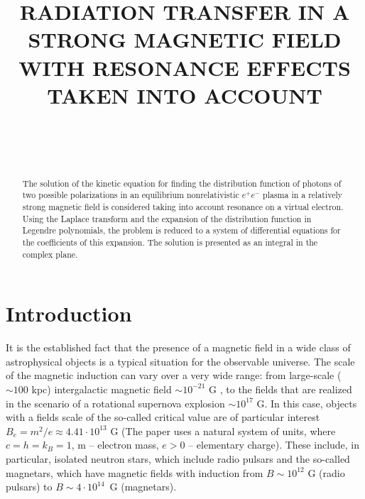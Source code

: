 \documentclass[
aps,%
12pt,%
final,%
notitlepage,%
oneside,%
onecolumn,%
nobibnotes,%
nofootinbib,%
superscriptaddress,%
noshowpacs,%
centertags]%
{revtex4}
\begin{document}

\title{\uppercase{Radiation transfer in a strong magnetic field with resonance effects taken into account}}%

\author{~}
%
\author{~}
%






\begin{abstract}
The solution of the kinetic equation for finding the distribution function of photons of two possible polarizations in an equilibrium nonrelativistic $e^+e^-$ plasma in a relatively strong magnetic field is considered taking into account resonance on a virtual electron.
Using the Laplace transform and the expansion of the distribution function in Legendre polynomials, the problem is reduced to a system of differential equations for the coefficients of this expansion. The solution is presented as an integral in the complex plane.
\end{abstract}

\maketitle

\section{Introduction}
It is the established fact that the presence of a magnetic field in a wide class of astrophysical objects is a typical situation for the observable universe. The scale of the magnetic induction can vary over a very wide range: from large-scale ($\sim 100$ kpc) intergalactic magnetic field $\sim 10^{-21}$ G \cite{D.Ryu:2012}, to the fields that are realized in the scenario of a rotational supernova explosion $\sim 10^{17}$ G. In this case, objects with a fields scale of the so-called critical value are of particular interest $B_e=m^2/e\approx4.41\cdot10^{13}$ G (The paper uses a natural system of units, where $c=h=k_B=1$, m -- electron mass, $e>0$ -- elementary charge). These include, in particular, isolated neutron stars, which include radio pulsars and the so-called magnetars, which have magnetic fields with induction from $B\sim10^{12}$ G (radio pulsars) to $B\sim4\cdot10^{14}$~G (magnetars). 
\end{document}
